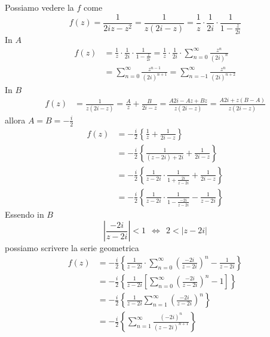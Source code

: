 Possiamo vedere la $f$ come
\begin{equation*}
f(z) = \frac{1}{2iz - z^{2}} = \frac{1}{z\left(2i - z\right)} = \frac{1}{z} \cdot \frac{1}{2i} \cdot \frac{1}{1 - \frac{z}{2i}}
\end{equation*}
In $A$
\begin{align*}
f(z) & = \frac{1}{z} \cdot \frac{1}{2i} \cdot \frac{1}{1 - \frac{z}{2i}} = \frac{1}{z} \cdot \frac{1}{2i} \cdot \sum\limits^{\infty}_{n = 0}\frac{z^{n}}{\left(2i\right)^{n}}\\
 & = \sum\limits^{\infty}_{n = 0}\frac{z^{n - 1}}{\left(2i\right)^{n + 1}} = \sum\limits^{\infty}_{n = -1}\frac{z^{n}}{\left(2i\right)^{n + 2}}
\end{align*}
In $B$
\begin{align*}
f(z) & = \frac{1}{z\left(2i - z\right)} = \frac{A}{z} + \frac{B}{2i - z} = \frac{A2i - Az + Bz}{z\left(2i - z\right)} = \frac{A2i + z\left(B - A\right)}{z\left(2i - z\right)}
\end{align*}
allora $A = B = -\frac{i}{2}$
\begin{align*}
f(z) & = - \frac{i}{2}\left\{\frac{1}{z} + \frac{1}{2i - z}\right\}\\
 & = - \frac{i}{2}\left\{\frac{1}{\left(z - 2i\right) + 2i} + \frac{1}{2i - z}\right\}\\
 & = - \frac{i}{2}\left\{\frac{1}{z - 2i} \cdot \frac{1}{1 + \frac{2i}{z - 2i}} + \frac{1}{2i - z}\right\}\\
 & = - \frac{i}{2}\left\{\frac{1}{z - 2i} \cdot \frac{1}{1 - \frac{- 2i}{z - 2i}} - \frac{1}{z - 2i}\right\}
\end{align*}
Essendo in $B$
\begin{equation*}
\left| \frac{- 2i}{z - 2i}\right| < 1\ \ \iff \ \ 2 < \left| z - 2i\right|
\end{equation*}
possiamo scrivere la serie geometrica
\begin{align*}
f(z) & = - \frac{i}{2}\left\{\frac{1}{z - 2i} \cdot \sum\limits^{\infty}_{n = 0}\left(\frac{- 2i}{z - 2i}\right)^{n} - \frac{1}{z - 2i}\right\}\\
 & = - \frac{i}{2}\left\{\frac{1}{z - 2i}\left[\sum\limits^{\infty}_{n = 0}\left(\frac{- 2i}{z - 2i}\right)^{n} - 1\right]\right\}\\
 & = - \frac{i}{2}\left\{\frac{1}{z - 2i}\sum\limits^{\infty}_{n = 1}\left(\frac{- 2i}{z - 2i}\right)^{n}\right\}\\
 & = - \frac{i}{2}\left\{\sum\limits^{\infty}_{n = 1}\frac{\left(- 2i\right)^{n}}{\left(z - 2i\right)^{n + 1}}\right\}
\end{align*}

